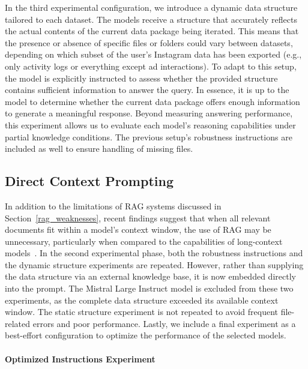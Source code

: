 \documentclass{DESSThesis}
\begin{document}
\noindent In the third experimental configuration, we introduce a dynamic data structure tailored to each dataset. The models receive a structure that accurately reflects the actual contents of the current data package being iterated. This means that the presence or absence of specific files or folders could vary between datasets, depending on which subset of the user's Instagram data has been exported (e.g., only activity logs or everything except ad interactions). To adapt to this setup, the model is explicitly instructed to assess whether the provided structure contains sufficient information to answer the query. In essence, it is up to the model to determine whether the current data package offers enough information to generate a meaningful response. Beyond measuring answering performance, this experiment allows us to evaluate each model's reasoning capabilities under partial knowledge conditions. The previous setup's robustness instructions are included as well to ensure handling of missing files.

\subsection{Direct Context Prompting}

In addition to the limitations of RAG systems discussed in Section~\ref{rag_weaknesses}, recent findings suggest that when all relevant documents fit within a model's context window, the use of RAG may be unnecessary, particularly when compared to the capabilities of long-context models~\cite{10.1145/3701716.3715490}. In the second experimental phase, both the robustness instructions and the dynamic structure experiments are repeated. However, rather than supplying the data structure via an external knowledge base, it is now embedded directly into the prompt. The Mistral Large Instruct model is excluded from these two experiments, as the complete data structure exceeded its available context window. The static structure experiment is not repeated to avoid frequent file-related errors and poor performance. Lastly, we include a final experiment as a best-effort configuration to optimize the performance of the selected models.

\paragraph{Optimized Instructions Experiment}\mbox{}\\
\end{document}
